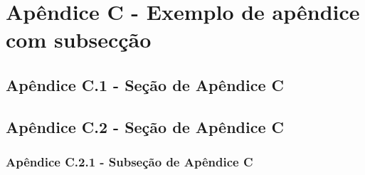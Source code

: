 %
%
%
%
%
\chapter{Apêndice C - Exemplo de apêndice com subsecção}


\section{Apêndice C.1 - Seção de Apêndice C}



\section{Apêndice C.2 - Seção de Apêndice C}



\subsection{Apêndice C.2.1 - Subseção de Apêndice C}